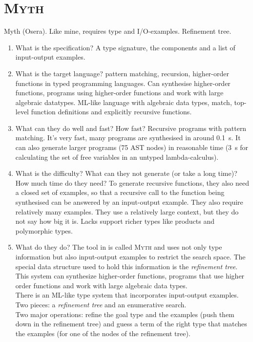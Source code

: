 \section{\textsc{Myth}}
Myth (Osera). Like mine, requires type and I/O-examples. Refinement tree.
\begin{enumerate}
\item What is the specification?
A type signature, the components and a list of input-output examples.
\item What is the target language?
pattern matching, recursion, higher-order functions in typed programming languages. Can synthesise higher-order functions, programs using higher-order functions and work with large algebraic datatypes.
ML-like language with algebraic data types, match, top-level function definitions and explicitly recursive functions.
\item What can they do well and fast? How fast?
Recursive programs with pattern matching. It's very fast, many programs are synthesised in around 0.1~s. It can also generate larger programs (75 AST nodes) in reasonable time (3~s for calculating the set of free variables in an untyped lambda-calculus).
\item What is the difficulty? What can they not generate (or take a long time)? How much time do they need?
To generate recursive functions, they also need a closed set of examples, so that a recursive call to the function being synthesised can be answered by an input-output example. They also require relatively many examples. They use a relatively large context, but they do not say how big it is.
Lacks support richer types like products and polymorphic types.
\item What do they do?
The tool in \cite{MythPaper} is called \textsc{Myth} and uses not only type information but also input-output examples to restrict the search space. The special data structure used to hold this information is the \emph{refinement tree}. This system can synthesize higher-order functions, programs that use higher order functions and work with large algebraic data types.\\
There is an ML-like type system that incorporates input-output examples. Two pieces: a \emph{refinement tree} and an enumerative search.\\
Two major operations: refine the goal type and the examples (push them down in the refinement tree) and guess a term of the right type that matches the examples (for one of the nodes of the refinement tree).\\
\end{enumerate}





